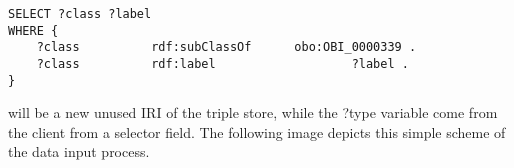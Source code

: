 \begin{lstlisting}[captionpos=b, caption= SPARQL query for the input form, label=skullJSON, belowskip=1em, aboveskip=2em,
basicstyle=\footnotesize,frame=single]
SELECT ?class ?label
WHERE {
	?class 			rdf:subClassOf	 	obo:OBI_0000339 .  
	?class			rdf:label					?label . 
}
\end{lstlisting}

will be a new unused IRI of the triple store, while the ?type variable come from the client from a selector field. The following image depicts this simple scheme of the data input process. 


